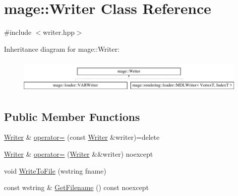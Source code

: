 \hypertarget{classmage_1_1_writer}{}\section{mage\+:\+:Writer Class Reference}
\label{classmage_1_1_writer}


{\ttfamily \#include $<$writer.\+hpp$>$}

Inheritance diagram for mage\+:\+:Writer\+:\begin{figure}[H]
\begin{center}
\leavevmode
\includegraphics[height=1.676647cm]{classmage_1_1_writer}
\end{center}
\end{figure}
\subsection*{Public Member Functions}
\begin{DoxyCompactItemize}
\item 
\hyperlink{classmage_1_1_writer}{Writer} \& \hyperlink{classmage_1_1_writer_a81ea888d1b170515713432ca28629ceb}{operator=} (const \hyperlink{classmage_1_1_writer}{Writer} \&writer)=delete
\item 
\hyperlink{classmage_1_1_writer}{Writer} \& \hyperlink{classmage_1_1_writer_a03a93796179f22be90471bea0f7a7cf0}{operator=} (\hyperlink{classmage_1_1_writer}{Writer} \&\&writer) noexcept
\item 
void \hyperlink{classmage_1_1_writer_a9af5416468b0a51983d07aec8061eb27}{Write\+To\+File} (wstring fname)
\item 
const wstring \& \hyperlink{classmage_1_1_writer_aedbc8d5fa02444ecba2e040ca8e98281}{Get\+Filename} () const noexcept
\end{DoxyCompactItemize}
